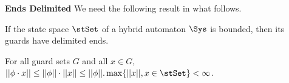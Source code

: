 {\large \textbf{Ends Delimited}}
We need the following result in what follows.
\begin{prop}
	\label{prop:ED}
	If the state space $\stSet$ of a hybrid automaton $\Sys$ is bounded, then its guards have delimited ends.
\end{prop}
\begin{prf}
	For all guard sets $G$ and all $x \in G$, $||\phi \cdot x || \leq ||\phi|| \cdot ||x|| \leq ||\phi||.\max\{||x||, x\in \stSet \} < \infty$.
\end{prf}